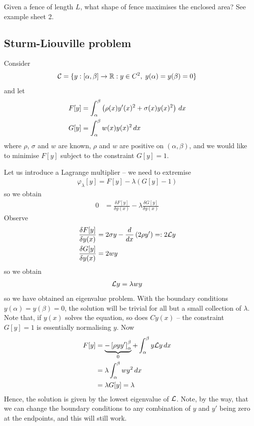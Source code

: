 \documentclass{../template/note}
\begin{document}
    \begin{example*}
        Given a fence of length $L$, what shape of fence maximises the enclosed area? See example sheet 2.
    \end{example*}
    
    \subsection{Sturm-Liouville problem}
    \label{sturm-liouville}

    Consider
    \begin{align*}
        \mathcal{C} = \{y: [\alpha, \beta] \to \mathbb R: y \in C^2,\; y(\alpha) = y(\beta) = 0\}
    \end{align*}
    and let
    \begin{align*}
        F[y] &= \int_\alpha^\beta \left(\rho(x) y'(x)^2 + \sigma(x) y(x)^2\right) \,d{x} \\
        G[y] &= \int_\alpha^\beta w(x) y(x)^2 \,d{x} 
    \end{align*}
    where $\rho$, $\sigma$ and $w$ are known, $\rho$ and $w$ are positive on $(\alpha, \beta)$, and we would like to minimise $F[y]$ subject to the constraint $G[y] = 1$.

    Let us introduce a Lagrange multiplier -- we need to extremise
    \begin{align*}
        \varphi_\lambda[y] = F[y] - \lambda(G[y]-1)
    \end{align*}
    so we obtain
    \begin{align*}
        0 &= \frac{\delta F[y]}{\delta y(x)} - \lambda \frac{\delta G[y]}{\delta y(x)}
    \end{align*}
    Observe
    \begin{align*}
        \frac{\delta F[y]}{\delta y(x)} &= 2\sigma y - \frac{d}{dx}\left(2 \rho y'\right) =: 2 \mathcal{L} y \\
        \frac{\delta G[y]}{\delta y(x)} &= 2wy
    \end{align*}
    so we obtain
    \begin{align*}
        \mathcal{L} y = \lambda w y
    \end{align*}
    so we have obtained an eigenvalue problem. With the boundary conditions $y(\alpha) = y(\beta) = 0$, the solution will be trivial for all but a small collection of $\lambda$. Note that, if $y(x)$ solves the equation, so does $Cy(x)$ -- the constraint $G[y] = 1$ is essentially normalising $y$. Now
    \begin{align*}
        F[y] &= \underbrace{-\left[\rho y y'\right]_\alpha^\beta}_0 + \int_\alpha^\beta y\mathcal{L} y \,d{x} \\
        &= \lambda \int_\alpha^\beta wy^2 \,d{x} \\
        &= \lambda G[y] = \lambda
    \end{align*}
    Hence, the solution is given by the lowest eigenvalue of $\mathcal{L}$. Note, by the way, that we can change the boundary conditions to any combination of $y$ and $y'$ being zero at the endpoints, and this will still work.
\end{document}
